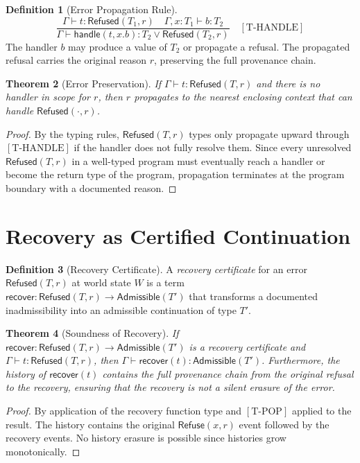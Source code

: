 \documentclass[12pt, a4paper, openany]{book}
\theoremstyle{plain}
\newtheorem{theorem}{Theorem}[chapter]
\theoremstyle{definition}
\newtheorem{definition}[theorem]{Definition}
\theoremstyle{remark}
\newcommand{\Refuse}{\mathsf{Refuse}}
\newcommand{\Adm}{\mathsf{Admissible}}
\newcommand{\Rfsd}{\mathsf{Refused}}
\begin{document}
\begin{definition}[Error Propagation Rule]
\[
\frac{\Gamma \vdash t : \Rfsd(T_1, r) \quad \Gamma, x : T_1 \vdash b : T_2}{\Gamma \vdash \mathsf{handle}(t, x.b) : T_2 \vee \Rfsd(T_2, r)}
\quad [\mathrm{T\text{-}HANDLE}]
\]
The handler $b$ may produce a value of $T_2$ or propagate a refusal. The
propagated refusal carries the original reason $r$, preserving the full provenance
chain.
\end{definition}

\begin{theorem}[Error Preservation]
If $\Gamma \vdash t : \Rfsd(T, r)$ and there is no handler in scope for $r$,
then $r$ propagates to the nearest enclosing context that can handle
$\Rfsd(\cdot, r)$.
\end{theorem}

\begin{proof}
By the typing rules, $\Rfsd(T, r)$ types only propagate upward through
$[\mathrm{T\text{-}HANDLE}]$ if the handler does not fully resolve them. Since
every unresolved $\Rfsd(T, r)$ in a well-typed program must eventually reach a
handler or become the return type of the program, propagation terminates at the
program boundary with a documented reason.
\end{proof}

\section{Recovery as Certified Continuation}

\begin{definition}[Recovery Certificate]
A \emph{recovery certificate} for an error $\Rfsd(T, r)$ at world state $W$ is a
term $\mathsf{recover} : \Rfsd(T, r) \to \Adm(T')$ that transforms a documented
inadmissibility into an admissible continuation of type $T'$.
\end{definition}

\begin{theorem}[Soundness of Recovery]
If $\mathsf{recover} : \Rfsd(T, r) \to \Adm(T')$ is a recovery certificate and
$\Gamma \vdash t : \Rfsd(T, r)$, then $\Gamma \vdash \mathsf{recover}(t) : \Adm(T')$.
Furthermore, the history of $\mathsf{recover}(t)$ contains the full provenance
chain from the original refusal to the recovery, ensuring that the recovery is
not a silent erasure of the error.
\end{theorem}

\begin{proof}
By application of the recovery function type and $[\mathrm{T\text{-}POP}]$ applied
to the result. The history contains the original $\Refuse(x, r)$ event followed
by the recovery events. No history erasure is possible since histories grow
monotonically.
\end{proof}
\end{document}
